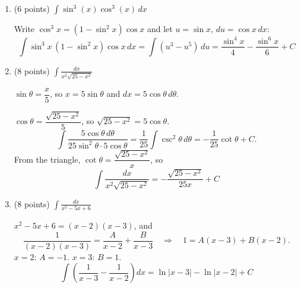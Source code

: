 \documentclass[12pt]{article}
\newcommand{\ds}{\displaystyle}
\begin{document}
\begin{enumerate}
\begin{enumerate}
  \item (6 points) $\ds \int \sin^3(x) \cos^3(x) \, dx$
    \begin{solution}
      Write $\cos^3 x = (1-\sin^2 x)\cos x$ and let $u = \sin x$, $du = \cos x\,dx$:
      \[
        \int \sin^3 x\,(1-\sin^2 x)\cos x\,dx = \int (u^3 - u^5)\,du
        = \boxed{\frac{\sin^4 x}{4} - \frac{\sin^6 x}{6} + C}
      \]
    \end{solution}
    \vfill

    \newpage

  \item (8 points) $\ds \int \frac{dx}{x^2 \sqrt{25-x^2}}$
    \begin{solution}
      \begin{center}
      \end{center}
      $\sin\theta = \dfrac{x}{5}$, so $x = 5\sin\theta$ and $dx = 5\cos\theta\,d\theta$.

      $\cos\theta = \dfrac{\sqrt{25-x^2}}{5}$, so $\sqrt{25-x^2} = 5\cos\theta$.
      \[
        \int \frac{5\cos\theta\,d\theta}{25\sin^2\theta\cdot 5\cos\theta}
        = \frac{1}{25}\int \csc^2\theta\,d\theta = -\frac{1}{25}\cot\theta + C.
      \]
      From the triangle, $\cot\theta = \dfrac{\sqrt{25-x^2}}{x}$, so
      \[
        \boxed{\int \frac{dx}{x^2\sqrt{25-x^2}} = -\frac{\sqrt{25-x^2}}{25x} + C}
      \]
    \end{solution}
    \vfill

  \item (8 points) $\ds \int \frac{dx}{x^2-5x+6} $
    \begin{solution}
      $x^2 - 5x + 6 = (x-2)(x-3)$, and
      \[
        \frac{1}{(x-2)(x-3)} = \frac{A}{x-2} + \frac{B}{x-3}
        \quad\Longrightarrow\quad 1 = A(x-3) + B(x-2).
      \]
      $x = 2$: $A = -1$. \quad $x = 3$: $B = 1$.
      \[
        \int\left(\frac{1}{x-3} - \frac{1}{x-2}\right)dx
        = \boxed{\ln|x-3| - \ln|x-2| + C}
      \]
    \end{solution}
    \vfill
  \end{enumerate}

  \newpage


\end{enumerate}
\end{document}
